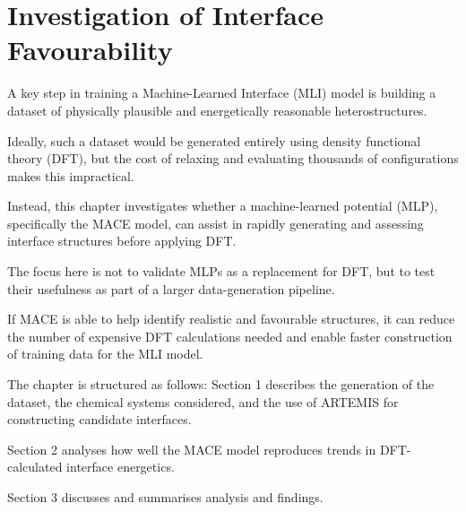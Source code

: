 \chapter{Investigation of Interface Favourability} \label{chapter:computational_investigation}


A key step in training a Machine-Learned Interface (MLI) model is building a dataset of physically plausible and
energetically reasonable heterostructures.

Ideally, such a dataset would be generated entirely using density functional theory (DFT), but the cost of relaxing and
evaluating thousands of configurations makes this impractical.

Instead, this chapter investigates whether a machine-learned potential (MLP), specifically the MACE model, can assist in
rapidly generating and assessing interface structures before applying DFT.


The focus here is not to validate MLPs as a replacement for DFT, but to test their usefulness as part of a larger
data-generation pipeline.

If MACE is able to help identify realistic and favourable structures, it can reduce the number of expensive DFT
calculations needed and enable faster construction of training data for the MLI model.


The chapter is structured as follows: Section 1 describes the generation of the dataset, the chemical systems
considered, and the use of ARTEMIS for constructing candidate interfaces.

Section 2 analyses how well the MACE model reproduces trends in DFT-calculated interface energetics.

Section 3 discusses and summarises analysis and findings.

